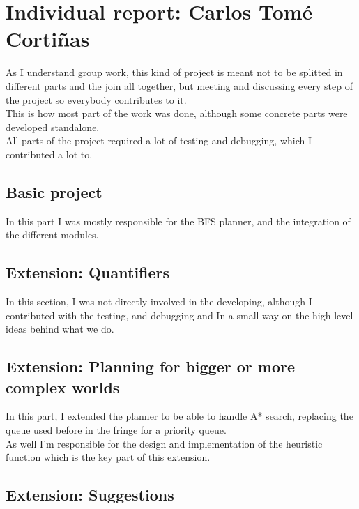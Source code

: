 \documentclass[11pt]{article}
\begin{document}
\section{Individual report: Carlos Tomé Cortiñas}
As I understand group work, this kind of project is meant not to be splitted 
in different parts and the join all together, but meeting and discussing every step
of the project so everybody contributes to it.  \\

This is how most part of the work was done, although some concrete parts were 
developed standalone.  \\

All parts of the project required a lot of testing and debugging, which I 
contributed a lot to.  \\

\subsection{Basic project}
In this part I was mostly responsible for the BFS planner, and the integration 
of the different modules. \\

\subsection{Extension: Quantifiers}
In this section, I was not directly involved in the developing, although I 
contributed with the testing, and debugging and In a small way on the high 
level ideas behind what we do.  \\

\subsection{Extension: Planning for bigger or more complex worlds}

In this part, I extended the planner to be able to handle A* search, replacing 
the queue used before in the fringe for a priority queue.  \\

As well I'm responsible for the design and implementation of the heuristic 
function which is the key part of this extension.  \\

\subsection{Extension: Suggestions}
\end{document}

